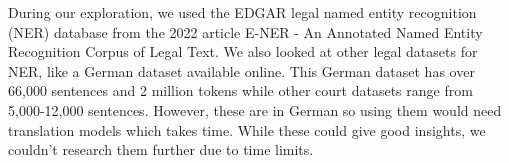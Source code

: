 \documentclass{article}
\begin{document}
During our exploration, we used the EDGAR legal named entity recognition (NER) database from the 2022 article E-NER - An Annotated Named Entity Recognition Corpus of Legal Text.  We also looked at other legal datasets for NER, like a German dataset available online.  This German dataset has over 66,000 sentences and 2 million tokens while other court datasets range from 5,000-12,000 sentences.  However, these are in German so using them would need translation models which takes time.  While these could give good insights, we couldn't research them further due to time limits.
\color{black}
\end{document}
